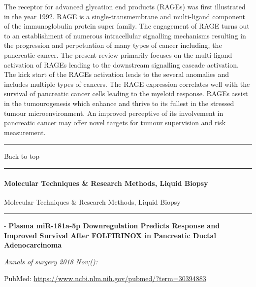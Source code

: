 \documentclass[]{article}
\let\oldparagraph\paragraph
\renewcommand{\paragraph}[1]{\oldparagraph{#1}\mbox{}}
\begin{document}
The receptor for advanced glycation end products (RAGEs) was first
illustrated in the year 1992. RAGE is a single-transmembrane and
multi-ligand component of the immunoglobulin protein super family. The
engagement of RAGE turns out to an establishment of numerous
intracellular signalling mechanisms resulting in the progression and
perpetuation of many types of cancer including, the pancreatic cancer.
The present review primarily focuses on the multi-ligand activation of
RAGEs leading to the downstream signalling cascade activation. The kick
start of the RAGEs activation leads to the several anomalies and
includes multiple types of cancers. The RAGE expression correlates well
with the survival of pancreatic cancer cells leading to the myeloid
response. RAGEs assist in the tumourogenesis which enhance and thrive to
its fullest in the stressed tumour microenvironment. An improved
perceptive of its involvement in pancreatic cancer may offer novel
targets for tumour supervision and risk measurement.

{}

{}

\begin{center}\rule{0.5\linewidth}{\linethickness}\end{center}

Back to top

\begin{center}\rule{0.5\linewidth}{\linethickness}\end{center}

\pagebreak

\hypertarget{molecular-techniques-research-methods-liquid-biopsy}{%
\paragraph{Molecular Techniques \& Research Methods, Liquid
Biopsy}\label{molecular-techniques-research-methods-liquid-biopsy}}

Molecular Techniques \& Research Methods, Liquid Biopsy

\begin{center}\rule{0.5\linewidth}{\linethickness}\end{center}

 - \textbf{Plasma miR-181a-5p Downregulation Predicts Response and
Improved Survival After FOLFIRINOX in Pancreatic Ductal Adenocarcinoma}

\emph{Annals of surgery 2018 Nov;():}

PubMed: \url{https://www.ncbi.nlm.nih.gov/pubmed/?term=30394883}
\end{document}
